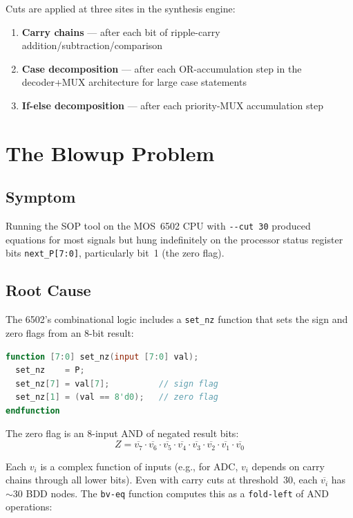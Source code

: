 \documentclass[11pt]{article}
\begin{document}
Cuts are applied at three sites in the synthesis engine:
\begin{enumerate}
\item \textbf{Carry chains} --- after each bit of ripple-carry
  addition/subtraction/comparison
\item \textbf{Case decomposition} --- after each OR-accumulation step
  in the decoder+MUX architecture for large case statements
\item \textbf{If-else decomposition} --- after each priority-MUX
  accumulation step
\end{enumerate}

\section{The Blowup Problem}

\subsection{Symptom}

Running the SOP tool on the MOS~6502 CPU with \texttt{-{}-cut~30}
produced equations for most signals but hung indefinitely on the
processor status register bits \texttt{next\_P[7:0]}, particularly
bit~1 (the zero flag).

\subsection{Root Cause}

The 6502's combinational logic includes a \texttt{set\_nz} function
that sets the sign and zero flags from an 8-bit result:

\begin{lstlisting}[language=Verilog]
function [7:0] set_nz(input [7:0] val);
  set_nz    = P;
  set_nz[7] = val[7];          // sign flag
  set_nz[1] = (val == 8'd0);   // zero flag
endfunction
\end{lstlisting}

The zero flag is an 8-input AND of negated result bits:
\[
  Z = \overline{v_7} \cdot \overline{v_6} \cdot \overline{v_5} \cdot
      \overline{v_4} \cdot \overline{v_3} \cdot \overline{v_2} \cdot
      \overline{v_1} \cdot \overline{v_0}
\]

Each $v_i$ is a complex function of inputs (e.g., for ADC, $v_i$
depends on carry chains through all lower bits).  Even with carry cuts
at threshold~30, each $\overline{v_i}$ has ${\sim}30$ BDD nodes.
The \texttt{bv-eq} function computes this as a \texttt{fold-left} of
AND operations:
\end{document}
